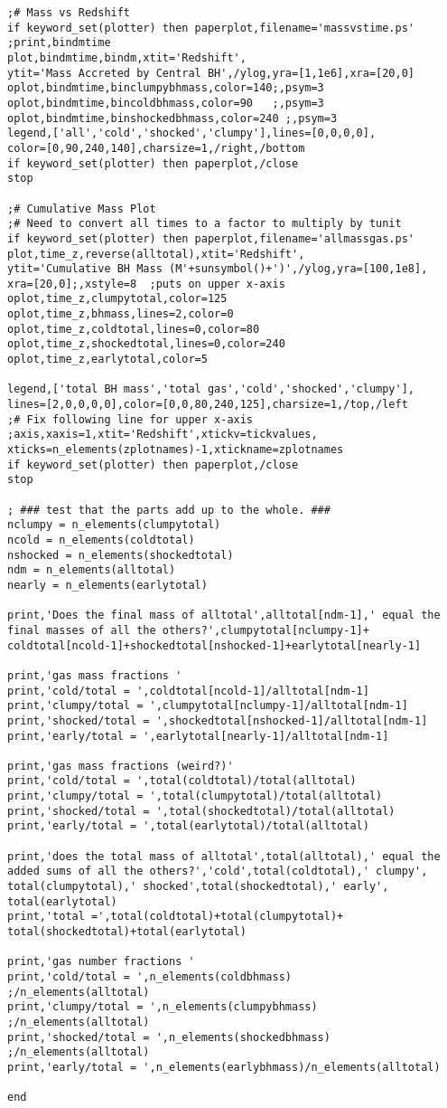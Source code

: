 \documentclass[12pt,headA,chapB]{fiskthesis}
\begin{document}
\begin{verbatim}
;# Mass vs Redshift
if keyword_set(plotter) then paperplot,filename='massvstime.ps'
;print,bindmtime
plot,bindmtime,bindm,xtit='Redshift',
ytit='Mass Accreted by Central BH',/ylog,yra=[1,1e6],xra=[20,0]
oplot,bindmtime,binclumpybhmass,color=140;,psym=3
oplot,bindmtime,bincoldbhmass,color=90   ;,psym=3
oplot,bindmtime,binshockedbhmass,color=240 ;,psym=3
legend,['all','cold','shocked','clumpy'],lines=[0,0,0,0],
color=[0,90,240,140],charsize=1,/right,/bottom
if keyword_set(plotter) then paperplot,/close
stop

;# Cumulative Mass Plot
;# Need to convert all times to a factor to multiply by tunit
if keyword_set(plotter) then paperplot,filename='allmassgas.ps'
plot,time_z,reverse(alltotal),xtit='Redshift',
ytit='Cumulative BH Mass (M'+sunsymbol()+')',/ylog,yra=[100,1e8],
xra=[20,0];,xstyle=8  ;puts on upper x-axis
oplot,time_z,clumpytotal,color=125
oplot,time_z,bhmass,lines=2,color=0
oplot,time_z,coldtotal,lines=0,color=80
oplot,time_z,shockedtotal,lines=0,color=240
oplot,time_z,earlytotal,color=5

legend,['total BH mass','total gas','cold','shocked','clumpy'],
lines=[2,0,0,0,0],color=[0,0,80,240,125],charsize=1,/top,/left
;# Fix following line for upper x-axis
;axis,xaxis=1,xtit='Redshift',xtickv=tickvalues,
xticks=n_elements(zplotnames)-1,xtickname=zplotnames
if keyword_set(plotter) then paperplot,/close
stop

; ### test that the parts add up to the whole. ###
nclumpy = n_elements(clumpytotal)
ncold = n_elements(coldtotal)
nshocked = n_elements(shockedtotal)
ndm = n_elements(alltotal)
nearly = n_elements(earlytotal)

print,'Does the final mass of alltotal',alltotal[ndm-1],' equal the 
final masses of all the others?',clumpytotal[nclumpy-1]+
coldtotal[ncold-1]+shockedtotal[nshocked-1]+earlytotal[nearly-1]

print,'gas mass fractions '
print,'cold/total = ',coldtotal[ncold-1]/alltotal[ndm-1]
print,'clumpy/total = ',clumpytotal[nclumpy-1]/alltotal[ndm-1]
print,'shocked/total = ',shockedtotal[nshocked-1]/alltotal[ndm-1]
print,'early/total = ',earlytotal[nearly-1]/alltotal[ndm-1]

print,'gas mass fractions (weird?)'
print,'cold/total = ',total(coldtotal)/total(alltotal)
print,'clumpy/total = ',total(clumpytotal)/total(alltotal)
print,'shocked/total = ',total(shockedtotal)/total(alltotal)
print,'early/total = ',total(earlytotal)/total(alltotal)

print,'does the total mass of alltotal',total(alltotal),' equal the 
added sums of all the others?','cold',total(coldtotal),' clumpy',
total(clumpytotal),' shocked',total(shockedtotal),' early',
total(earlytotal)
print,'total =',total(coldtotal)+total(clumpytotal)+
total(shockedtotal)+total(earlytotal)

print,'gas number fractions '
print,'cold/total = ',n_elements(coldbhmass)
;/n_elements(alltotal)
print,'clumpy/total = ',n_elements(clumpybhmass)
;/n_elements(alltotal)
print,'shocked/total = ',n_elements(shockedbhmass)
;/n_elements(alltotal)
print,'early/total = ',n_elements(earlybhmass)/n_elements(alltotal)

end
\end{verbatim}
\newpage
\end{document}
